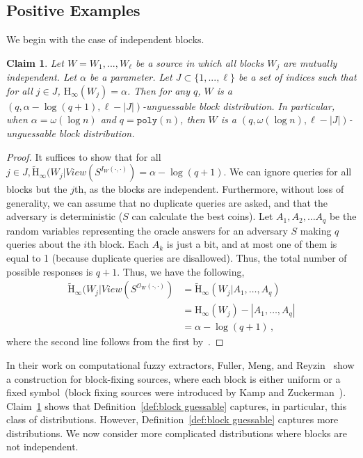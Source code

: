 \documentclass[11pt]{article}
\newcommand{\defref}[1]{\mbox{Definition~\ref{#1}}}
\newcommand{\clref}[1]{\mbox{Claim~\ref{#1}}}
\newcommand{\poly}{\ensuremath{\mathtt{poly}}\xspace}
\newcommand{\Hoo}{\mathrm{H}_\infty}
\newcommand{\Hav}{\tilde{\mathrm{H}}_\infty}
\newtheorem{claim}[theorem]{Claim}
\begin{document}
\subsection{Positive Examples}
\label{sec:positive ex}
We begin with the case of independent blocks.

\begin{claim}
\label{cl:independent high ent}
Let $W = W_1,  ... , W_\ell$ be a source in which all blocks $W_j$  are mutually independent.  Let $\alpha$ be a parameter.  Let $J\subset \{1,..., \ell\}$ be a set of indices such that for all $j\in J$, $\Hoo(W_j ) =\alpha $.  Then for any $q$, $W$ is a $(q, \alpha - \log (q+1), \ell - |J|)$-unguessable block distribution.  In particular, when $\alpha = \omega(\log n)$ and $q = \poly(n)$, then $W$ is a $(q, \omega(\log n), \ell - |J|)$-unguessable block distribution.
\end{claim}
\begin{proof}
It suffices to show that for all $j\in J, \Hav(W_j |View(S^{I_{W}(\cdot, \cdot)}) = \alpha -\log (q+1)$.
We can ignore queries for all blocks but the $j$th, as the blocks are independent. Furthermore, without loss of generality, we can assume that no duplicate queries are asked, and that the adversary is deterministic ($S$ can calculate the best coins). Let $A_1, A_2, \dots A_q$ be the random variables representing the oracle answers for an  adversary $S$ making $q$  queries about the $i$th block. Each $A_k$ is just a bit, and at most one of them  is equal to 1 (because duplicate queries are disallowed). Thus, the total number of possible responses is $q+1$. Thus, we have the following,
\begin{align*}
\Hav(W_j | View(S^{\mathcal{O}_{W}(\cdot, \cdot)}) &= \Hav(W_j| A_1, \dots, A_q)\\
&=\Hoo(W_j) - |A_1, \dots, A_q|\\
&=\alpha - \log (q+1)\,,
\end{align*}
where the second line follows from the first by~\cite[Lemma 2.2]{DBLP:journals/siamcomp/DodisORS08}.
\end{proof}
\noindent In their work on computational fuzzy extractors, Fuller, Meng, and Reyzin~\cite{fuller2013computational} show a construction for block-fixing sources, where each block is either uniform or a fixed symbol~(block fixing sources were introduced by Kamp and Zuckerman~\cite{KZ07}).  \clref{cl:independent high ent} shows that \defref{def:block guessable} captures, in particular, this class of distributions.
However, \defref{def:block guessable} captures more distributions.  We now consider more complicated distributions where blocks are not independent.
\end{document}

